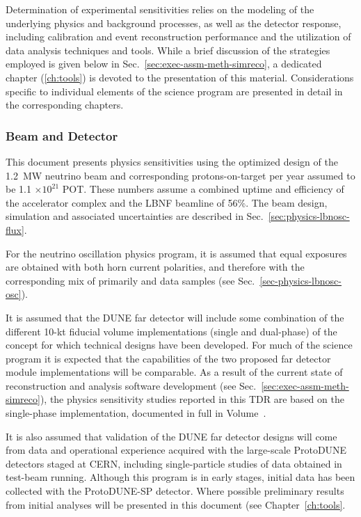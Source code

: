Determination of experimental sensitivities relies on the
modeling of the underlying physics and background processes,
as well as the detector response, including calibration and
event reconstruction performance and the utilization of data
analysis techniques and tools.
While a brief discussion of the strategies employed is given below
in Sec.~\ref{sec:exec-assm-meth-simreco}, a dedicated chapter
(\ref{ch:tools}) is devoted to the presentation of this material.
Considerations specific to individual elements of the science
program are presented in detail in the corresponding chapters.

\subsubsection{Beam and Detector}
\label{sec:exec-assm-meth-beamdetector}

This document presents physics sensitivities using
the optimized design of the 1.2~MW neutrino beam and
corresponding protons-on-target per year assumed to
be 1.1 $\times 10^{21}$ POT.  These numbers assume a combined
uptime and efficiency of the \fnal accelerator complex and the
LBNF beamline of 56\%.  The beam design, simulation and associated
uncertainties are described in
Sec.~\ref{sec:physics-lbnosc-flux}.

For the neutrino oscillation physics program, it is assumed that
equal exposures are obtained with both horn current polarities,
and therefore with the corresponding mix of primarily \numu
and \anumu data samples (see Sec.~\ref{sec-physics-lbnosc-osc}).

It is assumed that the DUNE far detector will include some
combination of the different 10-kt fiducial volume
implementations (single and dual-phase) of the \lartpc concept
for which technical designs have been developed.
For much of the science program it is expected that the
capabilities of the two proposed far detector module 
implementations will be comparable.  As a result of the
current state of reconstruction and analysis software development
(see Sec.~\ref{sec:exec-assm-meth-simreco}), the
physics sensitivity studies reported in this TDR are based on
the single-phase \lartpc implementation,
documented in full in Volume~\volnumbersp.

It is also assumed that validation of the DUNE far detector 
designs will come from data and operational experience acquired 
with the large-scale ProtoDUNE detectors staged at CERN, 
including single-particle studies of data obtained 
in test-beam running.  Although this program is in early stages, 
initial data has been collected with the ProtoDUNE-SP detector.  
Where possible preliminary results from initial analyses 
will be presented in this document (see Chapter~\ref{ch:tools}.

